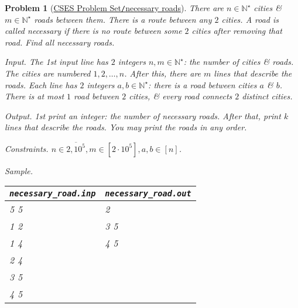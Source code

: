 \documentclass{article}
\newtheorem{problem}{Problem}
\begin{document}
\begin{problem}[\href{https://cses.fi/problemset/task/2076}{CSES Problem Set{\tt/}necessary roads}]
    There are $n\in\mathbb{N}^\star$ cities \& $m\in\mathbb{N}^\star$ roads between them. There is a route between any $2$ cities. A road is called {\rm necessary} if there is no route between some $2$ cities after removing that road. Find all necessary roads.
    \item {\sf Input.} The 1st input line has $2$ integers $n,m\in\mathbb{N}^\star$: the number of cities \& roads. The cities are numbered $1,2,\ldots,n$. After this, there are $m$ lines that describe the roads. Each line has $2$ integers $a,b\in\mathbb{N}^\star$: there is a road between cities $a$ \& $b$. There is at most $1$ road between $2$ cities, \& every road connects $2$ distinct cities.
    \item {\sf Output.} 1st print an integer: the number of necessary roads. After that, print $k$ lines that describe the roads. You may print the roads in any order.
    \item {\sf Constraints.} $n\in\overline{2,10^5},m\in[2\cdot10^5],a,b\in[n]$.
    \item {\sf Sample.}
    \begin{table}[H]
        \centering
        \begin{tabular}{|l|l|}
            \hline
            \verb|necessary_road.inp| & \verb|necessary_road.out| \\
            \hline
            5 5 & 2 \\
            1 2 & 3 5 \\
            1 4 & 4 5 \\
            2 4 & \\
            3 5 & \\
            4 5 & \\
            \hline
        \end{tabular}
    \end{table}
\end{problem}
\end{document}
